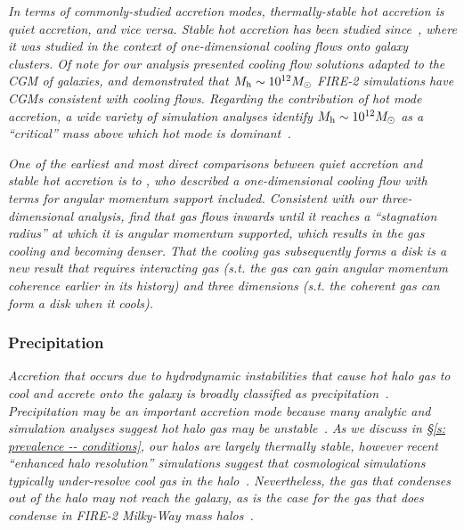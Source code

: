 \documentclass[fleqn,usenatbib]{mnras}
\begin{document}
\textit{
In terms of commonly-studied accretion modes, thermally-stable hot accretion is quiet accretion, and vice versa.
Stable hot accretion has been studied since~\cite{Cowie1977a}, where it was studied in the context of one-dimensional cooling flows onto galaxy clusters.
Of note for our analysis \cite{Stern2019} presented cooling flow solutions adapted to the CGM of galaxies, and \cite{Stern2020} demonstrated that $M_{\rm h} \sim 10^{12} M_\odot$ FIRE-2 simulations have CGMs consistent with cooling flows.
Regarding the contribution of hot mode accretion, a wide variety of simulation analyses identify $M_{\rm h} \sim 10^{12} M_\odot$ as a ``critical'' mass above which hot mode is dominant~\citep[e.g.][, and many others]{Correa2017, Stern2020}.
}

\textit{
One of the earliest and most direct comparisons between quiet accretion and stable hot accretion is to \cite{Cowie1980}, who described a one-dimensional cooling flow with terms for angular momentum support included.
Consistent with our three-dimensional analysis, \citeauthor{Cowie1980} find that gas flows inwards until it reaches a ``stagnation radius'' at which it is angular momentum supported, which results in the gas cooling and becoming denser.
That the cooling gas subsequently forms a disk is a new result that requires interacting gas (s.t. the gas can gain angular momentum coherence earlier in its history) and three dimensions (s.t. the coherent gas can form a disk when it cools).
}

\subsubsection{Precipitation}
\label{s: modes -- precipitation}

\textit{
Accretion that occurs due to hydrodynamic instabilities that cause hot halo gas to cool and accrete onto the galaxy is broadly classified as precipitation~\citep[e.g.][]{Sharma2012, Voit2015a, Voit2018, Voit2021}.
Precipitation may be an important accretion mode because many analytic and simulation analyses suggest hot halo gas may be unstable~\citep[e.g.][]{Balbus1989, Maller2004, McCourt2012, McCourt2016, Joung2012a, Li2014, Armillotta2016, McNamara2016, Schneider2018, Liang2018a, Gronke2019, Gronke2019a, Li2019, Fielding2020}.
As we discuss in \S\ref{s: prevalence -- conditions}, our halos are largely thermally stable, however recent ``enhanced halo resolution'' simulations suggest that cosmological simulations typically under-resolve cool gas in the halo~\citep{VandeVoort2018, Peeples2019a, Hummels2019, Suresh2019}.
Nevertheless, the gas that condenses out of the halo may not reach the galaxy, as is the case for the gas that does condense in FIRE-2 Milky-Way mass halos~\citep{Esmerian2020}.
}
\end{document}
